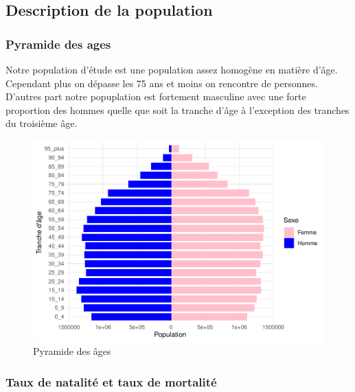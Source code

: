 \documentclass[
]{article}
\begin{document}
\hypertarget{description-de-la-population}{%
\subsection{Description de la
population}\label{description-de-la-population}}

\hypertarget{pyramide-des-ages}{%
\subsubsection{Pyramide des ages}\label{pyramide-des-ages}}

Notre population d'étude est une population assez homogène en matière
d'âge. Cependant plus on dépasse les 75 ans et moins on rencontre de
personnes. D'autres part notre popuplation est fortement masculine avec
une forte proportion des hommes quelle que soit la tranche d'âge à
l'exception des tranches du troisième âge.

\begin{figure}

{\centering \includegraphics{4_Analyse_Descriptive_files/figure-latex/unnamed-chunk-3-1} 

}

\caption{Pyramide des âges}\label{fig:unnamed-chunk-3}
\end{figure}

\hypertarget{taux-de-natalituxe9-et-taux-de-mortalituxe9}{%
\subsubsection{Taux de natalité et taux de
mortalité}\label{taux-de-natalituxe9-et-taux-de-mortalituxe9}}
\end{document}
